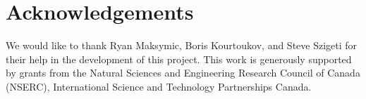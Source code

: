 \documentclass{chi-ext}
\begin{document}

\section{Acknowledgements}

We would like to thank Ryan Maksymic, Boris Kourtoukov, and Steve Szigeti for their help in the development of this project. This work is generously supported by grants from the Natural Sciences and Engineering Research Council of Canada (NSERC), International Science and Technology Partnerships Canada.

\balance


\end{document}
